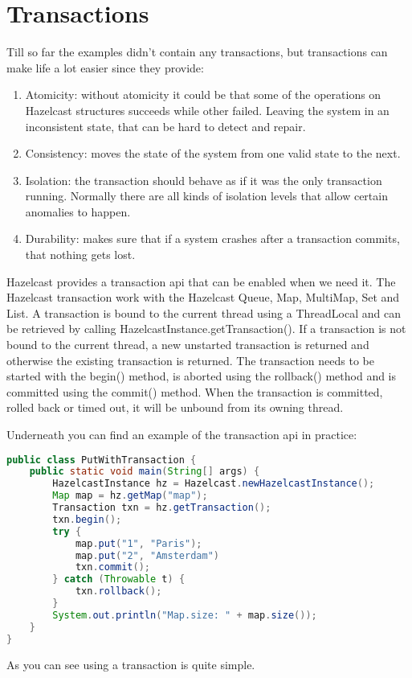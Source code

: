 \chapter{Transactions}
Till so far the examples didn't contain any transactions, but transactions can make life a lot easier since they provide:
\begin{enumerate}
\item Atomicity: without atomicity it could be that some of the operations on Hazelcast structures succeeds while other failed. Leaving the system in an inconsistent state, that can be hard to detect and repair.
\item Consistency: moves the state of the system from one valid state to the next.
\item Isolation: the transaction should behave as if it was the only transaction running. Normally there are all kinds of isolation levels that allow certain anomalies to happen.
\item Durability: makes sure that if a system crashes after a transaction commits, that nothing gets lost. 
\end{enumerate}
Hazelcast provides a transaction api that can be enabled when we need it. The Hazelcast transaction work with the Hazelcast Queue, Map, MultiMap, Set and List. A transaction is bound to the current thread using a ThreadLocal and can be retrieved by calling HazelcastInstance.getTransaction(). If a transaction is not bound to the current thread, a new unstarted transaction is returned and otherwise the existing transaction is returned. The transaction needs to be started with the begin() method, is aborted using the rollback() method and is committed using the commit() method. When the transaction is committed, rolled back or timed out, it will be unbound from its owning thread.

Underneath you can find an example of the transaction api in practice:
\begin{lstlisting}[language=java]
public class PutWithTransaction {
    public static void main(String[] args) {
        HazelcastInstance hz = Hazelcast.newHazelcastInstance();
        Map map = hz.getMap("map");
        Transaction txn = hz.getTransaction();
        txn.begin();
        try {
            map.put("1", "Paris");
            map.put("2", "Amsterdam")
            txn.commit();
        } catch (Throwable t) {
            txn.rollback();
        }
        System.out.println("Map.size: " + map.size());
    }
}
\end{lstlisting}
As you can see using a transaction is quite simple.

